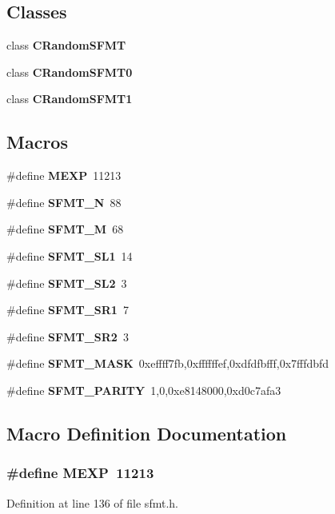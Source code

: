 \subsection*{Classes}
\begin{DoxyCompactItemize}
\item 
class {\bf C\-Random\-S\-F\-M\-T}
\item 
class {\bf C\-Random\-S\-F\-M\-T0}
\item 
class {\bf C\-Random\-S\-F\-M\-T1}
\end{DoxyCompactItemize}
\subsection*{Macros}
\begin{DoxyCompactItemize}
\item 
\#define {\bf M\-E\-X\-P}~11213
\item 
\#define {\bf S\-F\-M\-T\-\_\-\-N}~88
\item 
\#define {\bf S\-F\-M\-T\-\_\-\-M}~68
\item 
\#define {\bf S\-F\-M\-T\-\_\-\-S\-L1}~14
\item 
\#define {\bf S\-F\-M\-T\-\_\-\-S\-L2}~3
\item 
\#define {\bf S\-F\-M\-T\-\_\-\-S\-R1}~7
\item 
\#define {\bf S\-F\-M\-T\-\_\-\-S\-R2}~3
\item 
\#define {\bf S\-F\-M\-T\-\_\-\-M\-A\-S\-K}~0xeffff7fb,0xffffffef,0xdfdfbfff,0x7fffdbfd
\item 
\#define {\bf S\-F\-M\-T\-\_\-\-P\-A\-R\-I\-T\-Y}~1,0,0xe8148000,0xd0c7afa3
\end{DoxyCompactItemize}


\subsection{Macro Definition Documentation}
\subsubsection[{M\-E\-X\-P}]{\setlength{\rightskip}{0pt plus 5cm}\#define M\-E\-X\-P~11213}\label{rnd_2sfmt_8h_acff9c8882ddb918df117f9710013d828}


Definition at line 136 of file sfmt.\-h.

